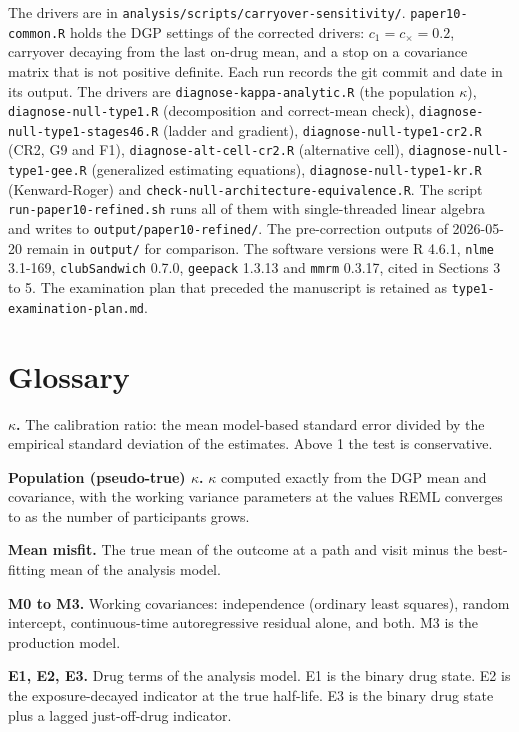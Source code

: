 \documentclass[
  11pt,
]{article}
\begin{document}
The drivers are in \texttt{analysis/scripts/carryover-sensitivity/}.
\texttt{paper10-common.R} holds the DGP settings of the corrected drivers:
\(c_1 = c_\times = 0.2\), carryover decaying from the last on-drug mean,
and a stop on a covariance matrix that is not positive definite. Each
run records the git commit and date in its output. The drivers are
\texttt{diagnose-kappa-analytic.R} (the population \(\kappa\)),
\texttt{diagnose-null-type1.R} (decomposition and correct-mean check),
\texttt{diagnose-null-type1-stages46.R} (ladder and gradient),
\texttt{diagnose-null-type1-cr2.R} (CR2, G9 and F1),
\texttt{diagnose-alt-cell-cr2.R} (alternative cell),
\texttt{diagnose-null-type1-gee.R} (generalized estimating equations),
\texttt{diagnose-null-type1-kr.R} (Kenward-Roger) and
\texttt{check-null-architecture-equivalence.R}. The script
\texttt{run-paper10-refined.sh} runs all of them with single-threaded linear
algebra and writes to \texttt{output/paper10-refined/}. The pre-correction
outputs of 2026-05-20 remain in \texttt{output/} for comparison. The
software versions were R
4.6.1, \texttt{nlme}
3.1-169, \texttt{clubSandwich} 0.7.0, \texttt{geepack} 1.3.13 and \texttt{mmrm} 0.3.17,
cited in Sections 3 to 5. The
examination plan that preceded the manuscript is retained as
\texttt{type1-examination-plan.md}.

\section*{Glossary}\label{glossary}

\textbf{\(\kappa\).} The calibration ratio: the mean model-based standard
error divided by the empirical standard deviation of the estimates.
Above 1 the test is conservative.

\textbf{Population (pseudo-true) \(\kappa\).} \(\kappa\) computed exactly from
the DGP mean and covariance, with the working variance parameters at
the values REML converges to as the number of participants grows.

\textbf{Mean misfit.} The true mean of the outcome at a path and visit
minus the best-fitting mean of the analysis model.

\textbf{M0 to M3.} Working covariances: independence (ordinary least
squares), random intercept, continuous-time autoregressive residual
alone, and both. M3 is the production model.

\textbf{E1, E2, E3.} Drug terms of the analysis model. E1 is the binary
drug state. E2 is the exposure-decayed indicator at the true
half-life. E3 is the binary drug state plus a lagged just-off-drug
indicator.
\end{document}
